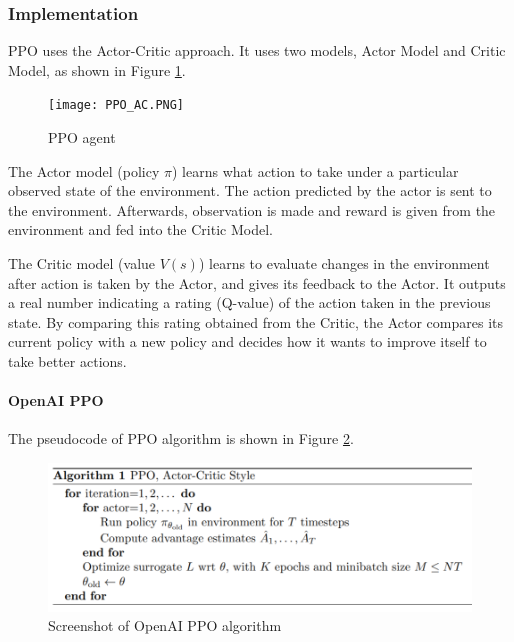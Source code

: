 \documentclass[lang=en,mode=normal,device=normal,color=blue,12pt]{elegantnote}
\DeclareMathOperator*{\1}{\mathbbm{1}}
\begin{document}






\subsubsection{Implementation}


PPO uses the Actor-Critic approach. It uses two models, Actor Model and Critic Model, as shown in Figure \ref{fig:ppo_ac}.

\begin{figure}[!ht]
  \centering
  \texttt{[image: PPO\_AC.PNG]}
  \caption{PPO agent}
  \label{fig:ppo_ac}
\end{figure}

The Actor model (policy $\pi$) learns what action to take under a particular observed state of the environment.
The action predicted by the actor is sent to the environment. Afterwards, observation is made and reward is given from the environment and fed into the Critic Model.

The Critic model (value $V(s)$) learns to evaluate changes in the environment after action is taken by the Actor, and gives its feedback to the Actor. It outputs a real number indicating a rating (Q-value) of the action taken in the previous state. By comparing this rating obtained from the Critic, the Actor compares its current policy with a new policy and decides how it wants to improve itself to take better actions.



\paragraph{OpenAI PPO}
The pseudocode of PPO algorithm is shown in Figure \ref{fig:ppo}.
\begin{figure}[h!]
  \centering
  \includegraphics[width=0.7\linewidth]{ppo_openai.PNG}
  \caption{Screenshot of OpenAI PPO algorithm}
  \label{fig:ppo}
\end{figure}
\end{document}
